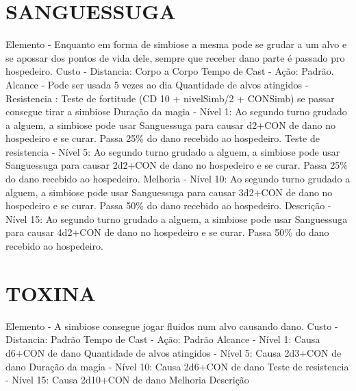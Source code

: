 \documentclass{article}%
\begin{document}
%
\section{SANGUESSUGA}%
\label{sec:SANGUESSUGA}%
Elemento {-}  Enquanto em forma de simbiose a mesma pode se grudar a um alvo e se apossar dos pontos de vida dele, sempre que receber dano parte é passado pro hospedeiro.\newline%
Custo {-} Distancia: Corpo a Corpo\newline%
Tempo de Cast {-} Ação: Padrão.\newline%
Alcance {-} Pode ser usada 5 vezes ao dia\newline%
Quantidade de alvos atingidos {-} Resistencia : Teste de fortitude (CD 10 + nivelSimb/2 + CONSimb) se passar consegue tirar a simbiose\newline%
Duração da magia {-} Nível 1: Ao segundo turno grudado a alguem, a simbiose pode usar Sanguessuga para causar d2+CON de dano no hospedeiro e se curar. Passa 25\% do dano recebido ao hospedeiro.\newline%
Teste de resistencia {-} Nível 5: Ao segundo turno grudado a alguem, a simbiose pode usar Sanguessuga para causar 2d2+CON de dano no hospedeiro e se curar. Passa 25\% do dano recebido ao hospedeiro.\newline%
Melhoria {-} Nível 10: Ao segundo turno grudado a alguem, a simbiose pode usar Sanguessuga para causar 3d2+CON de dano no hospedeiro e se curar. Passa 50\% do dano recebido ao hospedeiro.\newline%
Descrição {-} Nível 15: Ao segundo turno grudado a alguem, a simbiose pode usar Sanguessuga para causar 4d2+CON de dano no hospedeiro e se curar. Passa 50\% do dano recebido ao hospedeiro.\newline%

%
\section{TOXINA}%
\label{sec:TOXINA}%
Elemento {-}  A simbiose consegue jogar fluidos num alvo causando dano.\newline%
Custo {-} Distancia: Padrão\newline%
Tempo de Cast {-} Ação: Padrão\newline%
Alcance {-} Nível 1: Causa d6+CON de dano\newline%
Quantidade de alvos atingidos {-} Nível 5: Causa 2d3+CON de dano\newline%
Duração da magia {-} Nível 10: Causa 2d6+CON de dano\newline%
Teste de resistencia {-} Nível 15: Causa 2d10+CON de dano\newline%
Melhoria \newline%
Descrição \newline%
\end{document}
